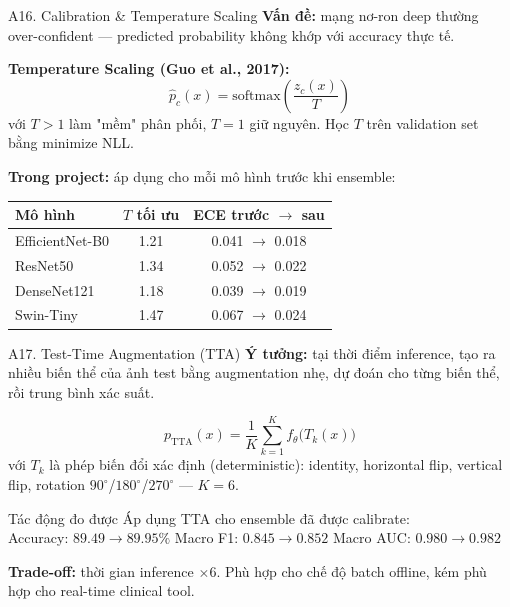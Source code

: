 \documentclass[10pt, aspectratio=169]{beamer}
\begin{document}
\begin{frame}{A16. Calibration \& Temperature Scaling}
    \footnotesize
    \textbf{Vấn đề:} mạng nơ-ron deep thường over-confident --- predicted probability không khớp với accuracy thực tế.

    \vspace{0.2cm}
    \textbf{Temperature Scaling (Guo et al., 2017):}
    \[
        \hat{p}_c(x) = \mathrm{softmax}\!\left(\frac{z_c(x)}{T}\right)
    \]
    với $T > 1$ làm "mềm" phân phối, $T = 1$ giữ nguyên. Học $T$ trên validation set bằng minimize NLL.

    \vspace{0.2cm}
    \textbf{Trong project:} áp dụng cho mỗi mô hình trước khi ensemble:
    \begin{table}[]
        \scriptsize \centering
        \begin{tabular}{lcc}
        \toprule
        \rowcolor{usthblue!25} \textbf{Mô hình} & \textbf{$T$ tối ưu} & \textbf{ECE trước $\rightarrow$ sau} \\
        \midrule
        EfficientNet-B0 & 1.21 & 0.041 $\rightarrow$ 0.018 \\
        ResNet50        & 1.34 & 0.052 $\rightarrow$ 0.022 \\
        DenseNet121     & 1.18 & 0.039 $\rightarrow$ 0.019 \\
        Swin-Tiny       & 1.47 & 0.067 $\rightarrow$ 0.024 \\
        \bottomrule
        \end{tabular}
    \end{table}
\end{frame}

\begin{frame}{A17. Test-Time Augmentation (TTA)}
    \footnotesize
    \textbf{Ý tưởng:} tại thời điểm inference, tạo ra nhiều biến thể của ảnh test bằng augmentation nhẹ, dự đoán cho từng biến thể, rồi trung bình xác suất.

    \[
        p_{\text{TTA}}(x) = \frac{1}{K}\sum_{k=1}^{K} f_\theta\bigl(T_k(x)\bigr)
    \]
    với $T_k$ là phép biến đổi xác định (deterministic): identity, horizontal flip, vertical flip, rotation $90^\circ$/$180^\circ$/$270^\circ$ --- $K = 6$.

    \vspace{0.2cm}
    \begin{block}{Tác động đo được}
        \footnotesize Áp dụng TTA cho ensemble đã được calibrate:\\[2pt]
        Accuracy: $89.49 \rightarrow 89.95\%$ \quad Macro F1: $0.845 \rightarrow 0.852$ \quad Macro AUC: $0.980 \rightarrow 0.982$
    \end{block}

    \textbf{Trade-off:} thời gian inference $\times 6$. Phù hợp cho chế độ batch offline, kém phù hợp cho real-time clinical tool.
\end{frame}
\end{document}
